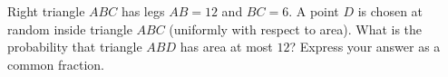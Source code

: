 Right triangle $ABC$ has legs $AB=12$ and $BC=6$. A point $D$ is chosen at random inside triangle $ABC$ (uniformly with respect to area). What is the probability that triangle $ABD$ has area at most $12$? Express your answer as a common fraction.
